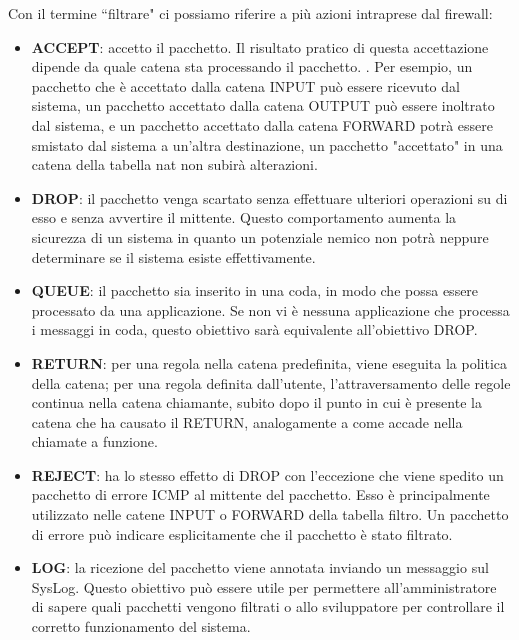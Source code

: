 Con il termine \textquotedblleft filtrare" ci possiamo riferire a più azioni intraprese dal firewall:
\begin{itemize}
\item \textbf{ACCEPT}: accetto il pacchetto. Il risultato pratico di questa accettazione dipende da quale catena sta processando il pacchetto. . Per esempio, un pacchetto che è accettato dalla catena INPUT può essere ricevuto dal sistema, un pacchetto accettato dalla catena OUTPUT può essere inoltrato dal sistema, e un pacchetto accettato dalla catena FORWARD potrà essere smistato dal sistema a un'altra destinazione, un pacchetto "accettato" in una catena della tabella nat non subirà alterazioni.
\item \textbf{DROP}: il pacchetto venga scartato senza effettuare ulteriori operazioni su di esso e senza avvertire il mittente.  Questo comportamento aumenta la sicurezza di un sistema in quanto un potenziale nemico non potrà neppure determinare se il sistema esiste effettivamente.
\item \textbf{QUEUE}:  il pacchetto sia inserito in una coda, in modo che possa essere processato da una applicazione. Se non vi è nessuna applicazione che processa i messaggi in coda, questo obiettivo sarà equivalente all'obiettivo DROP.
\item \textbf{RETURN}: per una regola nella catena predefinita, viene eseguita la politica della catena; per una regola definita dall'utente, l'attraversamento delle regole continua nella catena chiamante, subito dopo il punto in cui è presente la catena che ha causato il RETURN, analogamente a come accade nella chiamate a funzione.
\item \textbf{REJECT}: ha lo stesso effetto di DROP con l'eccezione che viene spedito un pacchetto di errore ICMP al mittente del pacchetto. Esso è principalmente utilizzato nelle catene INPUT o FORWARD della tabella filtro. Un pacchetto di errore può indicare esplicitamente che il pacchetto è stato filtrato.
\item \textbf{LOG}: la ricezione del pacchetto viene annotata inviando un messaggio sul SysLog. Questo obiettivo può essere utile per permettere all'amministratore di sapere quali pacchetti vengono filtrati o allo sviluppatore per controllare il corretto funzionamento del sistema.
\end{itemize}

